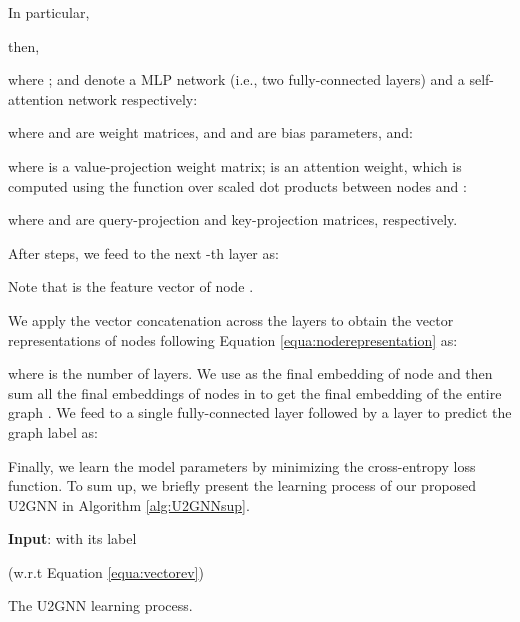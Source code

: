 \documentclass[twoside,leqno,twocolumn]{article}
\begin{document}
In particular,

then,

where ;  and    denote a MLP network (i.e., two fully-connected layers) and a self-attention network respectively: 

where  and  are weight matrices, and  and  are bias parameters, and: 

where  is a value-projection weight matrix;   is an attention weight, which is computed using the  function over scaled dot products between nodes  and :

where  and  are query-projection and key-projection matrices, respectively.


After  steps, we feed  to the next -th layer as:

Note that  is the feature vector of node .



We apply the vector concatenation across the layers to obtain the vector representations  of nodes  following Equation \ref{equa:noderepresentation} as:

where  is the number of layers.
We use  as the final embedding of node  and then sum all the final embeddings of nodes in  to get the final embedding  of the entire graph .
We feed  to a single fully-connected layer followed by a  layer to predict the graph label as:

Finally, we learn the model parameters by minimizing the cross-entropy loss function. To sum up, we briefly present the learning process of our proposed U2GNN in Algorithm \ref{alg:U2GNNsup}. 

\begin{algorithm}
\DontPrintSemicolon
\SetAlgoVlined

\textbf{Input}:  with its label 


 (w.r.t Equation \ref{equa:vectorev})





\caption{The U2GNN learning process.}
\label{alg:U2GNNsup}
\end{algorithm}
\end{document}
